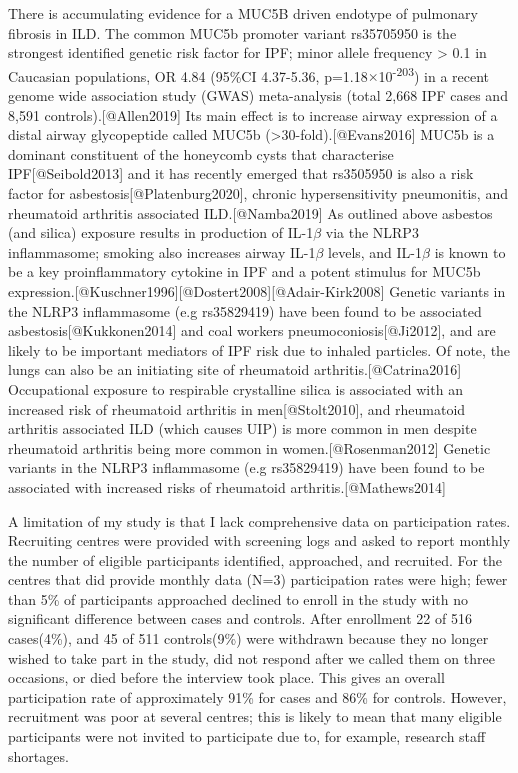 There is accumulating evidence for a MUC5B driven endotype of pulmonary
fibrosis in ILD. The common MUC5b promoter variant rs35705950 is the
strongest identified genetic risk factor for IPF; minor allele frequency
\textgreater{} 0.1 in Caucasian populations, OR 4.84 (95\%CI 4.37-5.36,
p=1.18\ensuremath{\times}10\textsuperscript{-203}) in a recent genome
wide association study (GWAS) meta-analysis (total 2,668 IPF cases and
8,591 controls).{[}@Allen2019{]} Its main effect is to increase airway
expression of a distal airway glycopeptide called MUC5b
(\textgreater30-fold).{[}@Evans2016{]} MUC5b is a dominant constituent
of the honeycomb cysts that characterise IPF{[}@Seibold2013{]} and it
has recently emerged that rs3505950 is also a risk factor for
asbestosis{[}@Platenburg2020{]}, chronic hypersensitivity pneumonitis,
and rheumatoid arthritis associated ILD.{[}@Namba2019{]} As outlined
above asbestos (and silica) exposure results in production of
IL-1\ensuremath{\beta} via the NLRP3 inflammasome; smoking also
increases airway IL-1\ensuremath{\beta} levels, and
IL-1\ensuremath{\beta} is known to be a key proinflammatory cytokine in
IPF and a potent stimulus for MUC5b
expression.{[}@Kuschner1996{]}{[}@Dostert2008{]}{[}@Adair-Kirk2008{]}
Genetic variants in the NLRP3 inflammasome (e.g rs35829419) have been
found to be associated asbestosis{[}@Kukkonen2014{]} and coal workers
pneumoconiosis{[}@Ji2012{]}, and are likely to be important mediators of
IPF risk due to inhaled particles. Of note, the lungs can also be an
initiating site of rheumatoid arthritis.{[}@Catrina2016{]} Occupational
exposure to respirable crystalline silica is associated with an
increased risk of rheumatoid arthritis in men{[}@Stolt2010{]}, and
rheumatoid arthritis associated ILD (which causes UIP) is more common in
men despite rheumatoid arthritis being more common in
women.{[}@Rosenman2012{]} Genetic variants in the NLRP3 inflammasome
(e.g rs35829419) have been found to be associated with increased risks
of rheumatoid arthritis.{[}@Mathews2014{]}

A limitation of my study is that I lack comprehensive data on
participation rates. Recruiting centres were provided with screening
logs and asked to report monthly the number of eligible participants
identified, approached, and recruited. For the centres that did provide
monthly data (N=3) participation rates were high; fewer than 5\% of
participants approached declined to enroll in the study with no
significant difference between cases and controls. After enrollment 22
of 516 cases(4\%), and 45 of 511 controls(9\%) were withdrawn because
they no longer wished to take part in the study, did not respond after
we called them on three occasions, or died before the interview took
place. This gives an overall participation rate of approximately 91\%
for cases and 86\% for controls. However, recruitment was poor at
several centres; this is likely to mean that many eligible participants
were not invited to participate due to, for example, research staff
shortages.

